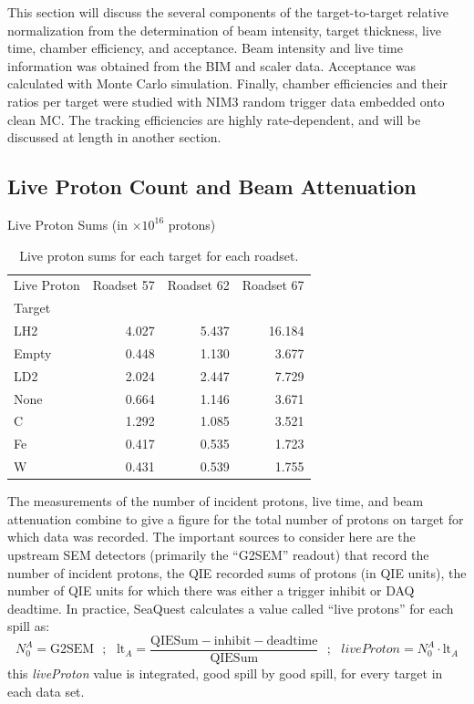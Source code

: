 This section will discuss the several components of the target-to-target relative normalization from the determination of beam intensity, target thickness, live time, chamber efficiency, and acceptance. Beam intensity and live time information was obtained from the BIM and scaler data. Acceptance was calculated with Monte Carlo simulation. Finally, chamber efficiencies and their ratios per target were studied with NIM3 random trigger data embedded onto clean MC. The tracking efficiencies are highly rate-dependent, and will be discussed at length in another section.

\subsection{Live Proton Count and Beam Attenuation}

\begin{table}
	\centering
	\caption*{Live Proton Sums (in $\times 10^{16}$ protons)}
	\vspace{-10px}
	\begin{tabular}{lrrr}
		\toprule
		Live Proton  &  Roadset 57 &  Roadset 62 &  Roadset 67  \\
		Target  &                    &                     &                    \\
		\midrule
		LH2    &            4.027 &           5.437 &          16.184 \\
		Empty  &        0.448 &           1.130 &           3.677 \\
		LD2     &       2.024 &           2.447 &           7.729 \\
		None   &        0.664 &           1.146 &           3.671 \\
		C         &      1.292 &           1.085 &           3.521 \\
		Fe        &      0.417 &           0.535 &           1.723 \\
		W        &      0.431 &           0.539 &           1.755 \\
		\bottomrule
	\end{tabular}
	\caption{Live proton sums for each target for each roadset.}
	\label{tab:livep}
\end{table}

The measurements of the number of incident protons, live time, and beam attenuation combine to give a figure for the total number of protons on target for which data was recorded. The important sources to consider here are the upstream SEM detectors (primarily the ``G2SEM'' readout) that record the number of incident protons, the QIE recorded sums of protons (in QIE units), the number of QIE units for which there was either a trigger inhibit or DAQ deadtime. In practice, SeaQuest calculates a value called ``live protons'' for each spill as:
\begin{equation}
 N_0^A = \text{G2SEM}\ \ \ ;\ \ \ \text{lt}_A = 
 \frac{\text{QIESum} - \text{inhibit} - \text{deadtime}}{\text{QIESum}}\ \ \ ;\ \ \ 
 liveProton = N_0^A \cdot \text{lt}_A
\end{equation}
this \emph{liveProton} value is integrated, good spill by good spill, for every target in each data set.

